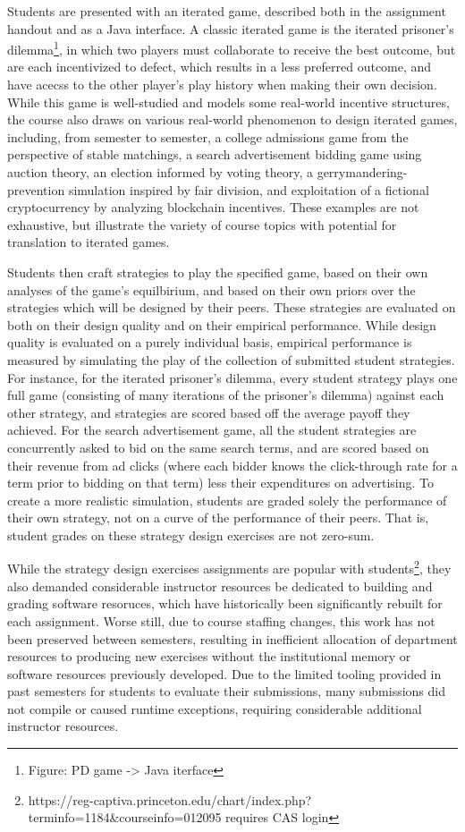 \documentclass[pageno]{jpaper}
\begin{document}
Students are presented with an iterated game, described both in the assignment handout and as a Java interface.
A classic iterated game is the iterated prisoner's dilemma\footnote{Figure: PD game -> Java iterface}, in which two players must collaborate to receive the best outcome, but are each incentivized to defect, which results in a less preferred outcome, and have acecss to the other player's play history when making their own decision.
While this game is well-studied and models some real-world incentive structures, the course also draws on various real-world phenomenon to design iterated games, including, from semester to semester, a college admissions game from the perspective of stable matchings, a search advertisement bidding game using auction theory, an election informed by voting theory, a gerrymandering-prevention simulation inspired by fair division, and exploitation of a fictional cryptocurrency by analyzing blockchain incentives.
These examples are not exhaustive, but illustrate the variety of course topics with potential for translation to iterated games.

Students then craft strategies to play the specified game, based on their own analyses of the game's equilbirium, and based on their own priors over the strategies which will be designed by their peers.
These strategies are evaluated on both on their design quality and on their empirical performance.
While design quality is evaluated on a purely individual basis, empirical performance is measured by simulating the play of the collection of submitted student strategies.
For instance, for the iterated prisoner's dilemma, every student strategy plays one full game (consisting of many iterations of the prisoner's dilemma) against each other strategy, and strategies are scored based off the average payoff they achieved.
For the search advertisement game, all the student strategies are concurrently asked to bid on the same search terms, and are scored based on their revenue from ad clicks (where each bidder knows the click-through rate for a term prior to bidding on that term) less their expenditures on advertising.
To create a more realistic simulation, students are graded solely the performance of their own strategy, not on a curve of the performance of their peers.
That is, student grades on these strategy design exercises are not zero-sum.

While the strategy design exercises assignments are popular with students\footnote{https://reg-captiva.princeton.edu/chart/index.php?terminfo=1184\&courseinfo=012095 requires CAS login}, they also demanded considerable instructor resources be dedicated to building and grading software resoruces, which have historically been significantly rebuilt for each assignment.
Worse still, due to course staffing changes, this work has not been preserved between semesters, resulting in inefficient allocation of department resources to producing new exercises without the institutional memory or software resources previously developed.
Due to the limited tooling provided in past semesters for students to evaluate their submissions, many submissions did not compile or caused runtime exceptions, requiring considerable additional instructor resources.
\end{document}
